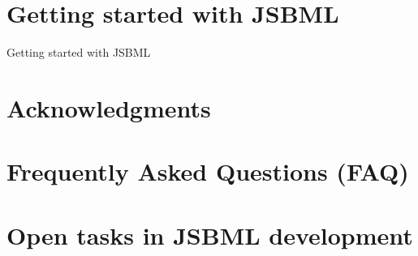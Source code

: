 \documentclass{JSBMLdoc}
\begin{document}
\maketitlepage
\maketableofcontents
\clearpage


\chapter{Getting started with JSBML}
\label{chp:getting-started}

Getting started with JSBML \cite{Draeger2011a, Draeger2011b}


\chapter{Acknowledgments}
\label{chp:acknowledgements}



\appendix

\chapter{Frequently Asked Questions (FAQ)}
\label{chp:faq}


\chapter{Open tasks in JSBML development}
\label{chp:open-tasks}



\clearpage

\thispagestyle{plain}
\pagestyle{plain}



\setindexprenote{\vspace*{0.1ex}}
\printindex
\end{document}
